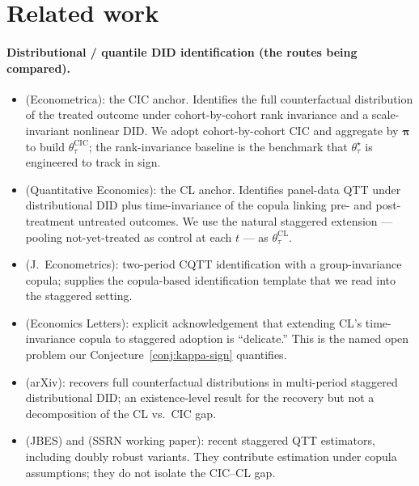 \documentclass[11pt]{article}
\theoremstyle{definition}
\theoremstyle{plain}
\theoremstyle{remark}
\begin{document}
\section{Related work}
\label{sec:related}

\paragraph{Distributional / quantile DID identification (the routes being compared).}
\begin{itemize}
  \item \citet{AtheyImbens2006} (Econometrica): the CIC anchor. Identifies the full counterfactual distribution of the treated outcome under cohort-by-cohort rank invariance and a scale-invariant nonlinear DID. We adopt cohort-by-cohort CIC and aggregate by $\boldsymbol\pi$ to build $\theta^{\mathrm{CIC}}_\tau$; the rank-invariance baseline is the benchmark that $\theta^\star_\tau$ is engineered to track in sign.
  \item \citet{CallawayLi2019} (Quantitative Economics): the CL anchor. Identifies panel-data QTT under distributional DID plus time-invariance of the copula linking pre- and post-treatment untreated outcomes. We use the natural staggered extension --- pooling not-yet-treated as control at each $t$ --- as $\theta^{\mathrm{CL}}_\tau$.
  \item \citet{CallawayLiOka2018} (J.\ Econometrics): two-period CQTT identification with a group-invariance copula; supplies the copula-based identification template that we read into the staggered setting.
  \item \citet{LiLin2024} (Economics Letters): explicit acknowledgement that extending CL's time-invariance copula to staggered adoption is ``delicate.'' This is the named open problem our Conjecture~\ref{conj:kappa-sign} quantifies.
  \item \citet{Ciaccio2025} (arXiv): recovers full counterfactual distributions in multi-period staggered distributional DID; an existence-level result for the recovery but not a decomposition of the CL vs.\ CIC gap.
  \item \citet{KimWooldridge2025} (JBES) and \citet{MillerGalvao2026} (SSRN working paper): recent staggered QTT estimators, including doubly robust variants. They contribute estimation under copula assumptions; they do not isolate the CIC--CL gap.
\end{itemize}
\end{document}
